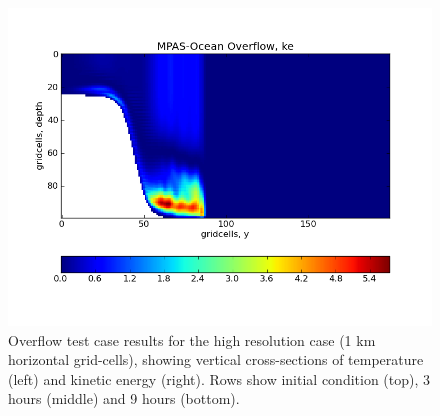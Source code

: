 \begin{figure}[H]
	\includegraphics[scale=0.4]{ocean/figures/MPAS-O_overflow_ke_9hrs.png}
	\caption{Overflow test case results for the high resolution case (1 km horizontal grid-cells), showing vertical cross-sections of temperature (left) and kinetic energy (right).  Rows show initial condition (top), 3 hours (middle) and 9 hours (bottom).}
	\label{fig:overflow}
\end{figure}
